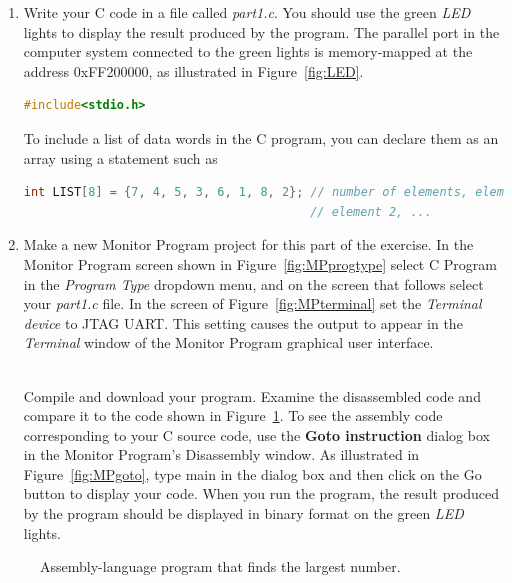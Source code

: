 \documentclass[epsfig,10pt,fullpage]{article}
\begin{document}
\begin{enumerate}
\item
Write your C code in a file called {\it part1.c}.  You should use the green {\it LED} lights
to display the result produced by the program. The parallel port in the computer system connected to
the green lights is memory-mapped at the address 0xFF200000, as illustrated in Figure~\ref{fig:LED}.

\begin{lstlisting}[language=C]
#include<stdio.h>
\end{lstlisting}

To include a list of data words in the C program, you can declare them as an array using
a statement such as

\begin{lstlisting}[language=C]
int LIST[8] = {7, 4, 5, 3, 6, 1, 8, 2}; // number of elements, element 1,
                                        // element 2, ...
\end{lstlisting}

\item
Make a new Monitor Program project for 
this part of the exercise. In the Monitor Program screen shown in
Figure~\ref{fig:MPprogtype} select {\sf C Program} in the {\it Program Type}
dropdown menu, and on the screen that follows select your {\it part1.c} file. In the screen of 
Figure~\ref{fig:MPterminal} set the {\it Terminal device} to {\sf JTAG UART}.
This setting causes the output to appear in the {\it Terminal} window of the Monitor Program 
graphical user interface.

~\\
\noindent
Compile and download your program. Examine the disassembled code and compare it
to the code shown in Figure~\ref{fig:code}. To see the assembly code corresponding to your 
C source code, use the {\bf Goto instruction} dialog box in the Monitor Program's Disassembly
window. As illustrated in Figure~\ref{fig:MPgoto}, type {\sf main} in the dialog box and then 
click on the {\sf Go} button to display your code. When you run the program, the result
produced by the program should be displayed in binary format on the green {\it LED} lights.

\end{enumerate}

\begin{figure}[H]
\begin{center}

\end{center}
\caption{Assembly-language program that finds the largest number.}
\label{fig:code}
\end{figure}
\end{document}
